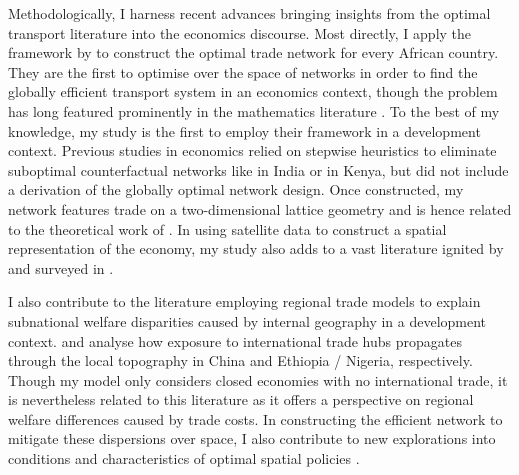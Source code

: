 \documentclass[11pt, oneside]{article}   	%
\begin{document}
Methodologically, I harness recent advances bringing insights from the optimal transport literature into the economics discourse. Most directly, I apply the framework by \cite{Fajgelbaum_OptimalTransportNetworks_2017} to construct the optimal trade network for every African country. They are the first to optimise over the space of networks in order to find the globally efficient transport system in an economics context, though the problem has long featured prominently in the mathematics literature \citep[for a textbook treatment, see][]{Bernot_OptimalTransportationNetworks_2009}. To the best of my knowledge, my study is the first to employ their framework in a development context. Previous studies in economics relied on stepwise heuristics to eliminate suboptimal counterfactual networks like \cite{Alder_ChineseRoadsIndia_2017} in India or \cite{Burgess_ValueDemocracyEvidence_2015} in Kenya, but did not include a derivation of the globally optimal network design. Once constructed, my network features trade on a two-dimensional lattice geometry and is hence related to the theoretical work of \cite{Allen_TradeTopographySpatial_2014,Allen_WelfareEffectsTransportation_2016}. In using satellite data to construct a spatial representation of the economy, my study also adds to a vast literature ignited by \cite{Henderson_MeasuringEconomicGrowth_2012} and surveyed in \cite{donaldson_view_2016}.

I also contribute to the literature employing regional trade models to explain subnational welfare disparities caused by internal geography in a development context. \cite{Cosar_InternalGeographyInternational_2016} and \cite{Atkin_WhoGettingGlobalized_2015} analyse how exposure to international trade hubs propagates through the local topography in China and Ethiopia / Nigeria, respectively. Though my model only considers closed economies with no international trade, it is nevertheless related to this literature as it offers a perspective on regional welfare differences caused by trade costs. In constructing the efficient network to mitigate these dispersions over space, I also contribute to new explorations into conditions and characteristics of optimal spatial policies \citep{Fajgelbaum_OptimalSpatialPolicies_2018}.
\end{document}
